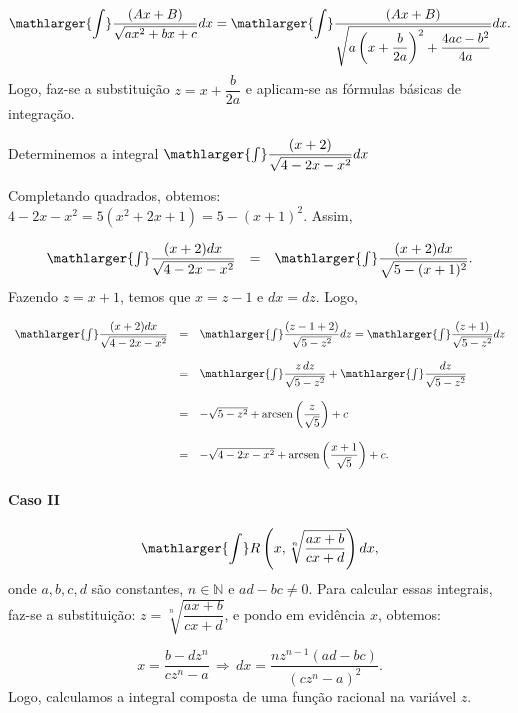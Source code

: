 \cleardoublepage\documentclass[../main.tex]{subfiles}
\begin{document}
\[ \mathlarger{\int} \dfrac{(Ax+B)}{\sqrt{ax^2+bx+c}}dx= \mathlarger{\int} \dfrac{(Ax+B)}{\sqrt{a\left(x+ \dfrac{b}{2a}\right)^2 +\dfrac{4ac-b^2}{4a}}}dx. \]
Logo, faz-se a substituição \(z=x+\dfrac{b}{2a}\) e aplicam-se as fórmulas básicas de integração.
\begin{ex}
Determinemos a integral \(\mathlarger{\int} \dfrac{(x+2)}{\sqrt{4-2x-x^2}}dx\)

\begin{solution}
Completando quadrados, obtemos: \(4-2x-x^2 = 5(x^2+2x+1)=5-(x+1)^2\). Assim,

\[ \begin{array}{rcl} \mathlarger{\int} \dfrac{(x+2)dx}{\sqrt{4-2x-x^2}} &=& \mathlarger{\int} \dfrac{(x+2)dx}{\sqrt{5-(x+1)^2}}. \end{array} \]
Fazendo \(z=x+1\), temos que \(x=z-1\) e \(dx=dz\). Logo,

\[ \begin{array}{rcl} \mathlarger{\int} \dfrac{(x+2)dx}{\sqrt{4-2x-x^2}} &=&\mathlarger{\int} \dfrac{(z-1+2)}{\sqrt{5-z^2}}dz = \mathlarger{\int} \dfrac{(z+1)}{\sqrt{5-z^2}}dz\\ \\ &=& \mathlarger{\int} \dfrac{z\,dz}{\sqrt{5-z^2}} + \mathlarger{\int} \dfrac{dz}{\sqrt{5-z^2}}\\ \\ &=&-\sqrt{5-z^2}+{\rm arcsen}\left(\dfrac{z}{\sqrt{5}} \right) +c\\ \\ &=&-\sqrt{4-2x-x^2}+{\rm arcsen}\left(\dfrac{x+1}{\sqrt{5}} \right) +c. \end{array} \]
\end{solution}
\end{ex}

\paragraph*{Caso II}
\[ \mathlarger{\int} R\left(x, \sqrt[n]{\dfrac{ax+b}{cx+d}} \right)dx, \]
onde \(a,b,c,d\) são constantes, \(n\in \mathbb{N}\) e \(ad-bc\neq 0\). Para calcular essas integrais, faz-se a substituição: \(z=\sqrt[n]{\dfrac{ax+b}{cx+d}}\), e pondo em evidência \(x\), obtemos:

\[ x=\dfrac{b-dz^n}{cz^n-a}\,\Rightarrow\,dx=\dfrac{nz^{n-1}(ad-bc)}{(cz^n-a)^2}. \]
Logo, calculamos a integral composta de uma função racional na variável \(z\).
\end{document}
